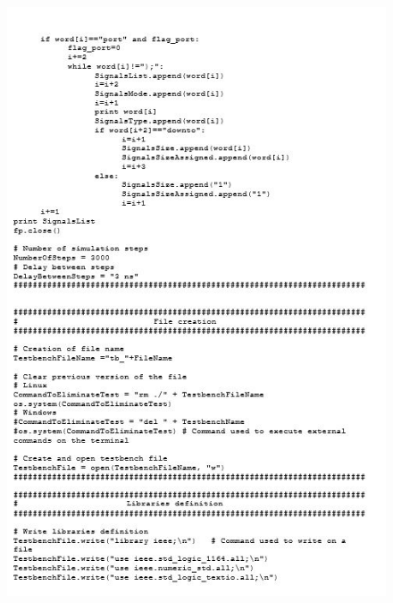 \begin{figure}[!htb]
	\centering
	\includegraphics[scale=1]{immagini/tbgen2}
	\label{tbgen2}
\end{figure}

